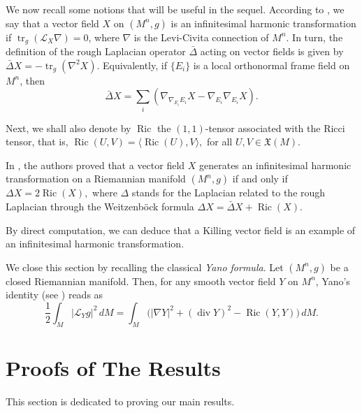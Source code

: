 \documentclass[a4paper, 12pt]{amsart}
\theoremstyle{definition}
\numberwithin{figure}{section}
\begin{document}
We now recall some notions that will be useful in the sequel. According to \cite{StepanovShandra2003}, we say that a vector field $X$ on $(M^n,g)$ is an infinitesimal harmonic transformation if $\operatorname{tr}_g (\mathcal{L}_X\nabla)=0$, where $\nabla$ is the Levi-Civita connection of $M^n$. In turn, the definition of the rough Laplacian operator \(\bar{\Delta}\) acting on vector fields is given by \(\bar{\Delta}X=-\operatorname{tr}_g(\nabla^2X)\). Equivalently, if \(\{E_i\}\) is a local orthonormal frame field on $M^n$, then
\begin{equation}\label{eq:rough-Laplacian}
\bar{\Delta}X
=
\sum_i\left(
\nabla_{\nabla_{E_i}E_i}X
-\nabla_{E_i}\nabla_{E_i}X
\right).
\end{equation}

Next, we shall also denote by \(\operatorname{Ric}\) the \((1,1)\)-tensor associated with the Ricci tensor, that is,
$
\operatorname{Ric}(U,V)=\langle \operatorname{Ric}(U),V\rangle,
$
for all \(U,V\in \mathfrak{X}(M)\).

In \cite{StepanovShandra2003}, the authors proved that a vector field \(X\) generates an infinitesimal harmonic transformation on a Riemannian manifold \((M^{n},g)\) if and only if
$ 
\Delta X = 2\operatorname{Ric}(X),
$
where \(\Delta\) stands for the Laplacian related to the rough Laplacian through the Weitzenböck formula
$
\Delta X=\bar{\Delta}X+\operatorname{Ric}(X).
$

By direct computation, we can deduce that a Killing vector field is an example of an infinitesimal harmonic transformation.

We close this section by recalling the classical \emph{Yano formula}.
Let $(M^n,g)$ be a closed Riemannian manifold. 
Then, for any smooth vector field $Y$ on $M^n$, Yano’s identity (see \cite[p.~170]{Poor1981}) reads as
\begin{equation}\label{eq:yano}
\frac{1}{2}\int_M |\mathcal{L}_Y g|^{2}\,dM
=
\int_M \big(
|\nabla Y|^{2}
+(\operatorname{div}Y)^{2}
-\operatorname{Ric}(Y,Y)
\big)\,dM .
\end{equation}

\section{Proofs of The Results}\label{sec:proofs}

This section is dedicated to proving our main results.
\end{document}
